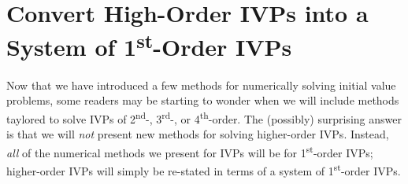 \section{Convert High-Order IVPs into a System of 1\textsuperscript{st}-Order IVPs}
Now that we have introduced a few methods for numerically solving initial value problems, some readers may be starting to wonder when we will include methods taylored to solve IVPs of 2\textsuperscript{nd}-, 3\textsuperscript{rd}-, or 4\textsuperscript{th}-order.  The (possibly) surprising answer is that we will \emph{not} present new methods for solving higher-order IVPs.  Instead, \emph{all} of the numerical methods we present for IVPs will be for 1\textsuperscript{st}-order IVPs; higher-order IVPs will simply be re-stated in terms of a system of 1\textsuperscript{st}-order IVPs.
